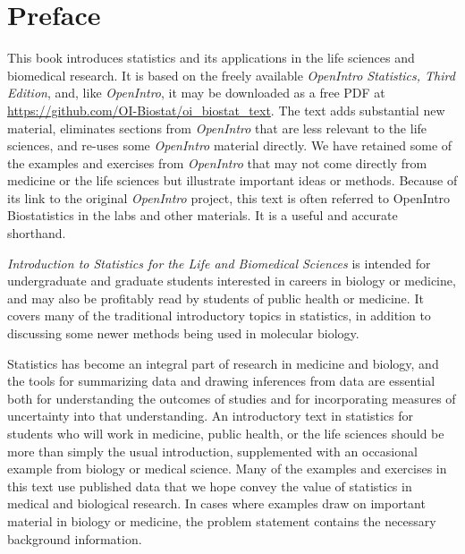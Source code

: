 

\chapter*{Preface}


This book introduces statistics and its applications in the life sciences and biomedical research.  It is based on the freely available \textsl{OpenIntro Statistics, Third Edition}, and, like \textsl{OpenIntro}, it may be downloaded as a free PDF at \url{https://github.com/OI-Biostat/oi_biostat_text}.  The text adds substantial new material, eliminates sections from \textsl{OpenIntro} that are less relevant to the life sciences, and re-uses some \textsl{OpenIntro} material directly. We have retained some of the examples and exercises from \textsl{OpenIntro} that may not come directly from medicine or the life sciences but illustrate important ideas or methods. Because of its link to the original \textsl{OpenIntro} project, this text is often referred to OpenIntro Biostatistics in the  labs and other materials. It is a useful and accurate shorthand.

\textsl{Introduction to Statistics for the Life and Biomedical Sciences} is intended for undergraduate and graduate students interested in careers in biology or medicine, and may also be profitably read by students of public health or medicine.  It covers many of the traditional introductory topics in statistics, in addition to discussing some newer methods being used in molecular biology. 

Statistics has become an integral part of research in medicine and biology, and the tools for summarizing data and drawing inferences from data are essential both for understanding the outcomes of studies and for incorporating measures of uncertainty into that understanding.  An introductory text in statistics for students who will work in medicine, public health, or the life sciences should be more than simply the usual introduction, supplemented with an occasional example from biology or medical science. Many of the examples and exercises in this text use published data that we hope convey the value of statistics in medical and biological research. In cases where examples draw on important material in biology or medicine, the problem statement contains the necessary background information. 

